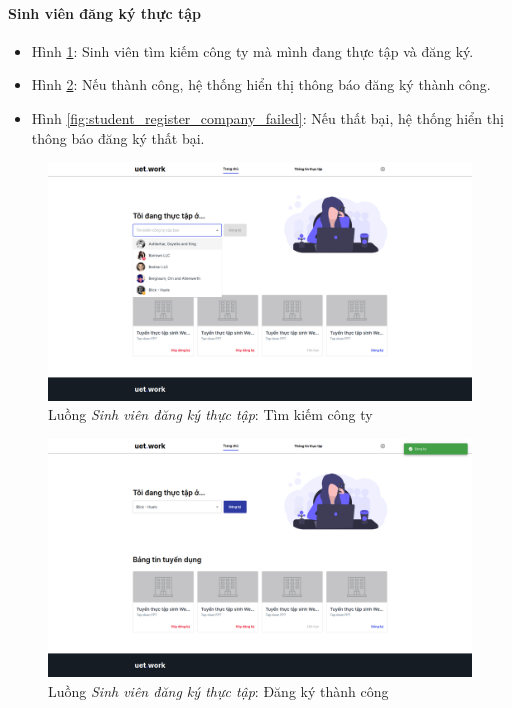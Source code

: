\documentclass[./../main.tex]{subfiles}
\begin{document}
\paragraph*{Sinh viên đăng ký thực tập}

\begin{itemize}
	\item Hình \ref{fig:student_find_company}: Sinh viên tìm kiếm công ty mà mình đang thực tập và đăng ký. 
	\item Hình \ref{fig:student_register_company_success}: Nếu thành công, hệ thống hiển thị thông báo đăng ký thành công.
	\item Hình \ref{fig:student_register_company_failed}: Nếu thất bại, hệ thống hiển thị thông báo đăng ký thất bại.
\end{itemize}

\begin{figure}[]
	\includegraphics[width=\linewidth]{./images/image39.png}
	\caption{Luồng \emph{Sinh viên đăng ký thực tập}: Tìm kiếm công ty}
	\label{fig:student_find_company}
\end{figure}

\begin{figure}[]
	\includegraphics[width=\linewidth]{./images/image40-1.png}
	\caption{Luồng \emph{Sinh viên đăng ký thực tập}: Đăng ký thành công}
	\label{fig:student_register_company_success}
\end{figure}
\end{document}
